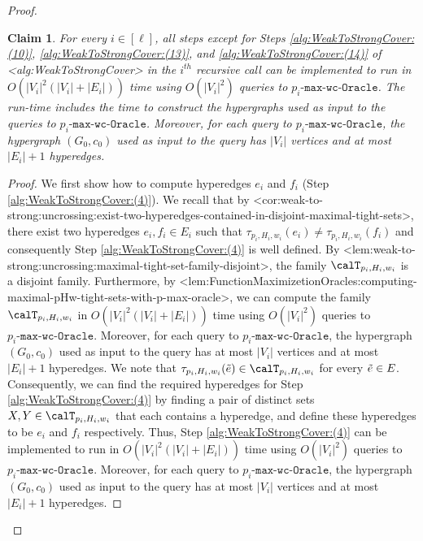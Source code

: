 \documentclass{article}
\def\Cref#1{<#1>}%
\newtheorem{claim}{Claim}[section]
\newcommand{\functionMaximizationOracle}[1]{\ensuremath{{#1}\text{-}\mathtt{max}\text{-}\mathtt{wc}\text{-}\mathtt{Oracle}}\xspace}
\newcommand{\maximalTightSetFamily}[1]{\ensuremath{\calT_{#1}}\xspace}
\newcommand{\maximalTightSetContainingHyperedge}[1]{\ensuremath{\tau_{#1}}\xspace}
\begin{document}
\begin{proof}
\begin{claim}\label{claim:weak-to-strong-runtime-of-one-recursive-call}
For every $i\in [\ell]$, all steps except for Steps \ref{alg:WeakToStrongCover:(10)},  \ref{alg:WeakToStrongCover:(13)}, and  \ref{alg:WeakToStrongCover:(14)} of \Cref{alg:WeakToStrongCover} in the $i^{th}$ recursive call can be implemented to run in 
$O(|V_i|^2(|V_i| + |E_i|))$ time
using 
$O(|V_i|^2)$ queries to \functionMaximizationOracle{p_i}. The run-time includes the time to construct the hypergraphs used as input to the queries to \functionMaximizationOracle{p_i}. Moreover, for each query to \functionMaximizationOracle{p_i}, the hypergraph $(G_0, c_0)$ used as input to the query has  $|V_i|$ vertices and at most $|E_i| + 1$ hyperedges.
\end{claim}
\begin{proof}
We first show how to compute hyperedges $e_i$ and $f_i$ (Step \ref{alg:WeakToStrongCover:(4)}). We recall that by \Cref{cor:weak-to-strong:uncrossing:exist-two-hyperedges-contained-in-disjoint-maximal-tight-sets}, there exist two hyperedges $e_i, f_i \in E_i$ such that $\maximalTightSetContainingHyperedge{p_i, H_i, w_i}(e_i) \not = \maximalTightSetContainingHyperedge{p_i, H_i, w_i}(f_i)$ and consequently Step \ref{alg:WeakToStrongCover:(4)} is well defined. By \Cref{lem:weak-to-strong:uncrossing:maximal-tight-set-family-disjoint}, the family $\maximalTightSetFamily{p_i, H_i, w_i}$ is a disjoint family. 
Furthermore,  by \Cref{lem:FunctionMaximizetionOracles:computing-maximal-pHw-tight-sets-with-p-max-oracle}, we can compute the family $\maximalTightSetFamily{p_i, H_i, w_i}$ in $O(|V_i|^2(|V_i|+|E_i|))$ time using $O(|V_i|^2)$ queries to \functionMaximizationOracle{p_i}. 
Moreover, for each query to \functionMaximizationOracle{p_i}, the hypergraph $(G_0, c_0)$ used as input to the query has at most $|V_i|$ vertices and at most $|E_i|+1$ hyperedges. 
We note that $\maximalTightSetContainingHyperedge{p_i, H_i, w_i}(\Tilde{e}) \in \maximalTightSetFamily{p_i, H_i, w_i}$ for every $\Tilde{e} \in E$.
Consequently, we can find the required hyperedges for Step \ref{alg:WeakToStrongCover:(4)} by finding a pair of distinct sets $X, Y \in \maximalTightSetFamily{p_i, H_i, w_i}$ that each contains a hyperedge, and define these hyperedges to be $e_i$ and $f_i$ respectively. Thus, Step  \ref{alg:WeakToStrongCover:(4)} can be implemented to run in $O(|V_i|^2(|V_i|+|E_i|))$ time using $O(|V_i|^2)$ queries to \functionMaximizationOracle{p_i}. Moreover, for each query to \functionMaximizationOracle{p_i}, the hypergraph $(G_0, c_0)$ used as input to the query has at most $|V_i|$ vertices and at most $|E_i|+1$ hyperedges. 


\end{proof}
\end{proof}
\end{document}
